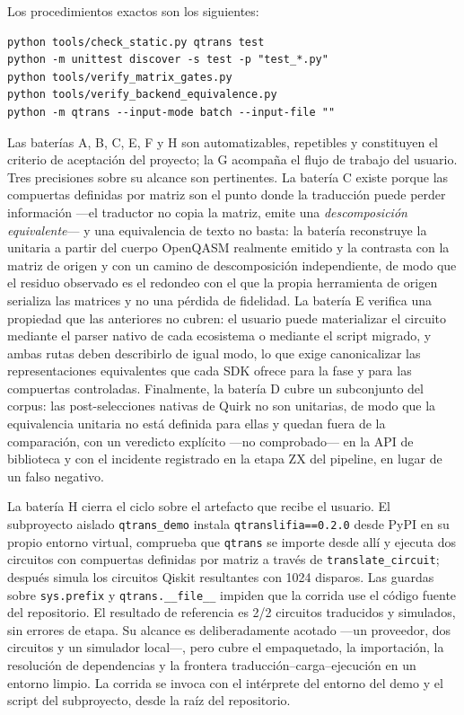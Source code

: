 \documentclass[11pt,a4paper]{article}
\newcommand{\code}[1]{\texttt{#1}}
\begin{document}
Los procedimientos exactos son los siguientes:
\begin{verbatim}
python tools/check_static.py qtrans test
python -m unittest discover -s test -p "test_*.py"
python tools/verify_matrix_gates.py
python tools/verify_backend_equivalence.py
python -m qtrans --input-mode batch --input-file ""
\end{verbatim}

Las baterías A, B, C, E, F y H son automatizables, repetibles y constituyen el criterio de
aceptación del proyecto; la G acompaña el flujo de trabajo del usuario. Tres precisiones
sobre su alcance son pertinentes. La batería C existe porque las compuertas definidas por
matriz son el punto donde la traducción puede perder información ---el traductor no copia la
matriz, emite una \emph{descomposición equivalente}--- y una equivalencia de texto no basta:
la batería reconstruye la unitaria a partir del cuerpo OpenQASM realmente emitido y la
contrasta con la matriz de origen y con un camino de descomposición independiente, de modo que
el residuo observado es el redondeo con el que la propia herramienta de origen serializa las
matrices y no una pérdida de fidelidad. La batería E verifica una propiedad que las
anteriores no cubren: el usuario puede materializar el circuito mediante el parser nativo de
cada ecosistema o mediante el script migrado, y ambas rutas deben describirlo de igual
modo, lo que exige canonicalizar las representaciones equivalentes que cada SDK ofrece
para la fase y para las compuertas controladas. Finalmente, la batería D cubre un subconjunto
del corpus: las post-selecciones nativas de Quirk no son unitarias, de modo que la
equivalencia unitaria no está definida para ellas y quedan fuera de la comparación, con un
veredicto explícito ---no comprobado--- en la API de biblioteca y con el incidente registrado
en la etapa ZX del pipeline, en lugar de un falso negativo.

La batería H cierra el ciclo sobre el artefacto que recibe el usuario. El subproyecto
aislado \code{qtrans\_demo} instala \code{qtranslifia==0.2.0} desde PyPI en su propio
entorno virtual, comprueba que \code{qtrans} se importe desde allí y ejecuta dos circuitos
con compuertas definidas por matriz a través de \code{translate\_circuit}; después simula
los circuitos Qiskit resultantes con 1024 disparos. Las guardas sobre \code{sys.prefix} y
\code{qtrans.\_\_file\_\_} impiden que la corrida use el código fuente del repositorio. El
resultado de referencia es 2/2 circuitos traducidos y simulados, sin errores de etapa. Su
alcance es deliberadamente acotado ---un proveedor, dos circuitos y un simulador local---,
pero cubre el empaquetado, la importación, la resolución de dependencias y la frontera
traducción--carga--ejecución en un entorno limpio. La corrida se invoca con el intérprete
del entorno del demo y el script del subproyecto, desde la raíz del repositorio.
\end{document}
